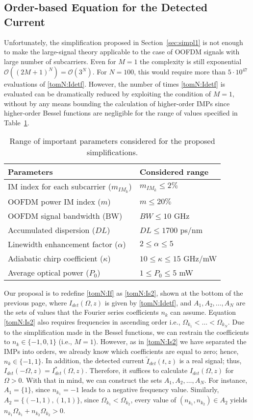 \documentclass[journal]{IEEEtran}
\begin{document}
\subsection{Order-based Equation for the Detected Current}
Unfortunately, the simplification proposed in Section~\ref{sec:simpl1} is not enough to make the large-signal theory applicable to the case of OOFDM signals with large number of subcarriers. Even for $M = 1$ the complexity is still exponential $\mathcal{O}((2M + 1)^N) = \mathcal{O}(3^N)$. For $N = 100$, this would require more than $5\cdot10^{47}$ evaluations of \eqref{tomN:Idetf}. However, the number of times \eqref{tomN:Idetf} is evaluated can be dramatically reduced by exploiting the condition of $M = 1$, without by any means bounding the calculation of higher-order IMPs since higher-order Bessel functions are negligible for the range of values specified in Table~\ref{tab:param}.
\begin{table}[t]
\caption{Range of important parameters considered for the proposed simplifications.}
\label{tab:param}
\centering
\begin{tabular}{l|l}
\hline
Parameters & Considered range \\
\hline
IM index for each subcarrier ($m_{IM_k}$)   		   & $m_{IM_k} \leq 2\%$     \\
OOFDM power IM index ($m$) & $m \leq 20\%$ \\
OOFDM signal bandwidth (BW) & $BW \leq 10$ GHz \\
Accumulated dispersion ($DL$)  								& $DL \leq 1700$ ps/nm    \\
Linewidth enhancement factor ($\alpha$)&  $2 \leq \alpha \leq 5$   \\
Adiabatic chirp coefficient ($\kappa$)  & 	$10 \leq \kappa \leq 15$ GHz/mW     \\
Average optical power ($P_0$)														 &  $1 \leq P_0 \leq 5$ mW \\
\hline
\end{tabular}
\end{table}
Our proposal is to redefine \eqref{tomN:If} as \eqref{tomN:Is2}, shown at the bottom of the previous page, where $I_{det}(\Omega,z)$ is given by \eqref{tomN:Idetf}, and $A_1, A_2,\ldots, A_N$ are the sets of values that the Fourier series coefficients $n_k$ can assume. Equation \eqref{tomN:Is2} also requires frequencies in ascending order i.e., $\Omega_{k_1} <\ldots < \Omega_{k_N}$. Due to the simplification made in the Bessel functions, we can restrain the coefficients to $n_k\in\{-1,0,1\}$ (i.e., $M = 1$). However, as in \eqref{tomN:Is2} we have separated the IMPs into orders, we already know which coefficients are equal to zero; hence, $n_k\in\{-1,1\}$. In addition, the detected current $\tilde{I}_{det}(t,z)$ is a real signal; thus, $I_{det}(-\Omega,z) = I_{det}^*(\Omega,z)$. Therefore, it suffices to calculate $I_{det}(\Omega,z)$ for $\Omega > 0$. With that in mind, we can construct the sets $A_1, A_2,\ldots, A_N$. For instance, $A_1 = \{1\}$, since $n_{k_1} = -1$ leads to a negative frequency value. Similarly, $A_2 = \{(-1, 1), (1, 1)\}$, since $\Omega_{k_1} < \Omega_{k_2}$, every value of $(n_{k_1}, n_{k_2}) \in A_2$ yields $n_{k_1}\Omega_{k_1}+n_{k_2}\Omega_{k_2} > 0$. 
\end{document}
